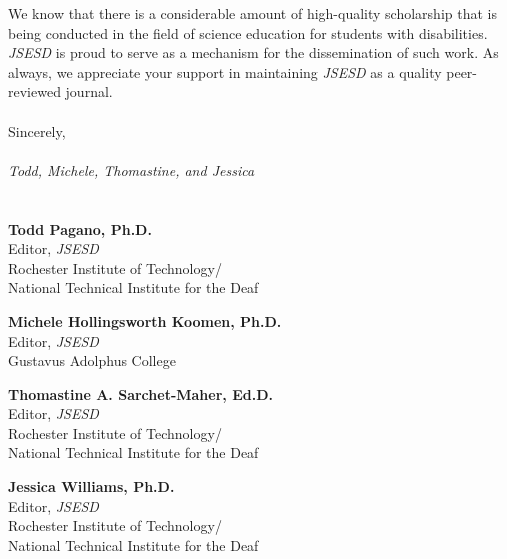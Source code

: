 \documentclass[11pt]{sig-alternate}
\begin{document}
\begin{large}
We know that there is a considerable amount of high-quality scholarship that is being conducted in the field of science education for students with disabilities. \textit{JSESD} is proud to serve as a mechanism for the dissemination of such work. As always, we appreciate your support in maintaining \textit{JSESD} as a quality peer-reviewed journal.
\\\\
Sincerely,
\\\\ \textit{Todd, Michele, Thomastine, and Jessica }
\\\\\\
\textbf{Todd Pagano, Ph.D.}\\
Editor, \textit{JSESD}\\
Rochester Institute of Technology/\\
National Technical Institute for the Deaf

\textbf{Michele Hollingsworth Koomen, Ph.D.}\\
Editor, \textit{JSESD}\\
Gustavus Adolphus College

\textbf{Thomastine A. Sarchet-Maher, Ed.D.}\\
Editor, \textit{JSESD}\\
Rochester Institute of Technology/\\
National Technical Institute for the Deaf

\textbf{Jessica Williams, Ph.D.}\\
Editor, \textit{JSESD}\\
Rochester Institute of Technology/\\
National Technical Institute for the Deaf

\end{large}
\end{document}
